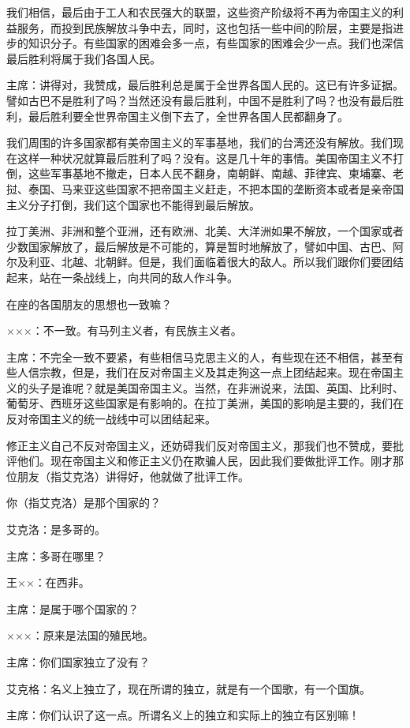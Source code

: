 我们相信，最后由于工人和农民强大的联盟，这些资产阶级将不再为帝国主义的利益服务，而投到民族解放斗争中去，同时，这也包括一些中间的阶层，主要是指进步的知识分子。有些国家的困难会多一点，有些国家的困难会少一点。我们也深信最后胜利将属于我们各国人民。

主席：讲得对，我赞成，最后胜利总是属于全世界各国人民的。这已有许多证据。譬如古巴不是胜利了吗？当然还没有最后胜利，中国不是胜利了吗？也没有最后胜利，最后胜利要全世界帝国主义倒下去了，全世界各国人民都翻身了。

我们周围的许多国家都有美帝国主义的军事基地，我们的台湾还没有解放。我们现在这样一种状况就算最后胜利了吗？没有。这是几十年的事情。美国帝国主义不打倒，这些军事基地不撤走，日本人民不翻身，南朝鲜、南越、菲律宾、柬埔寨、老挝、泰国、马来亚这些国家不把帝国主义赶走，不把本国的垄断资本或者是亲帝国主义分子打倒，我们这个国家也不能得到最后解放。

拉丁美洲、非洲和整个亚洲，还有欧洲、北美、大洋洲如果不解放，一个国家或者少数国家解放了，最后解放是不可能的，算是暂时地解放了，譬如中国、古巴、阿尔及利亚、北越、北朝鲜。但是，我们面临着很大的敌人。所以我们跟你们要团结起来，站在一条战线上，向共同的敌人作斗争。

在座的各国朋友的思想也一致嘛？

×××：不一致。有马列主义者，有民族主义者。

主席：不完全一致不要紧，有些相信马克思主义的人，有些现在还不相信，甚至有些人信宗教，但是，我们在反对帝国主义及其走狗这一点上团结起来。现在帝国主义的头子是谁呢？就是美国帝国主义。当然，在非洲说来，法国、英国、比利时、葡萄牙、西班牙这些国家是有影响的。在拉丁美洲，美国的影响是主要的，我们在反对帝国主义的统一战线中可以团结起来。

修正主义自己不反对帝国主义，还妨碍我们反对帝国主义，那我们也不赞成，要批评他们。现在帝国主义和修正主义仍在欺骗人民，因此我们要做批评工作。刚才那位朋友（指艾克洛）讲得好，他就做了批评工作。

你（指艾克洛）是那个国家的？

艾克洛：是多哥的。

主席：多哥在哪里？

王××：在西非。

主席：是属于哪个国家的？

×××：原来是法国的殖民地。

主席：你们国家独立了没有？

艾克格：名义上独立了，现在所谓的独立，就是有一个国歌，有一个国旗。

主席：你们认识了这一点。所谓名义上的独立和实际上的独立有区别嘛！


